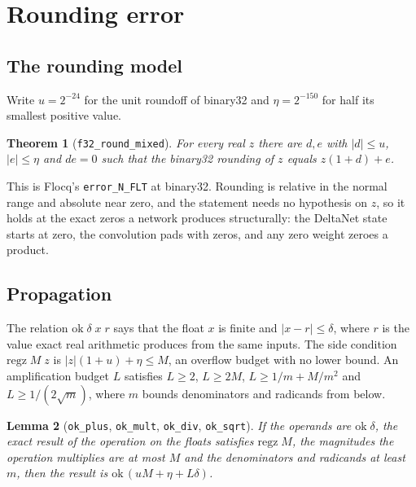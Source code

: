 \documentclass[11pt]{article}
\theoremstyle{plain}
\newtheorem{theorem}{Theorem}[section]
\newtheorem{lemma}[theorem]{Lemma}
\theoremstyle{definition}
\newcommand{\code}[1]{\texttt{#1}}
\begin{document}
\section{Rounding error}
\label{sec:err}

\subsection{The rounding model}

Write $u = 2^{-24}$ for the unit roundoff of binary32 and
$\eta = 2^{-150}$ for half its smallest positive value.

\begin{theorem}[\code{f32\_round\_mixed}]
For every real $z$ there are $d, e$ with $|d| \le u$, $|e| \le \eta$ and
$de = 0$ such that the binary32 rounding of $z$ equals $z(1+d) + e$.
\end{theorem}

This is Flocq's \code{error\_N\_FLT} at binary32. Rounding is relative in the
normal range and absolute near zero, and the statement needs no hypothesis on
$z$, so it holds at the exact zeros a network produces structurally: the
DeltaNet state starts at zero, the convolution pads with zeros, and any zero
weight zeroes a product.

\subsection{Propagation}

The relation $\mathrm{ok}\;\delta\;x\;r$ says that the float $x$ is finite and
$|x - r| \le \delta$, where $r$ is the value exact real arithmetic produces from
the same inputs. The side condition $\mathrm{regz}\;M\;z$ is
$|z|(1+u) + \eta \le M$, an overflow budget with no lower bound. An
amplification budget $L$ satisfies $L \ge 2$, $L \ge 2M$,
$L \ge 1/m + M/m^2$ and $L \ge 1/(2\sqrt{m})$, where $m$ bounds denominators and
radicands from below.

\begin{lemma}[\code{ok\_plus}, \code{ok\_mult}, \code{ok\_div}, \code{ok\_sqrt}]
If the operands are $\mathrm{ok}\;\delta$, the exact result of the operation on
the floats satisfies $\mathrm{regz}\;M$, the magnitudes the operation multiplies
are at most $M$ and the denominators and radicands at least $m$, then the
result is $\mathrm{ok}\,(uM + \eta + L\delta)$.
\end{lemma}
\end{document}
